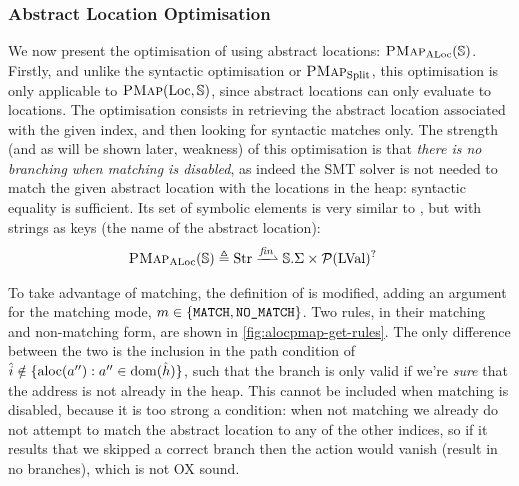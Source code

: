 \subsubsection{Abstract Location Optimisation}

We now present the optimisation of \PMap{} using abstract locations: $\textsc{PMap}_{\text{ALoc}}(\mathbb S)$. Firstly, and unlike the syntactic optimisation or $\textsc{PMap}_{\text{Split}}$, this optimisation is only applicable to $\textsc{PMap}(\text{Loc},\mathbb S)$, since abstract locations can only evaluate to locations. The optimisation consists in retrieving the abstract location associated with the given index, and then looking for syntactic matches only. The strength (and as will be shown later, weakness) of this optimisation is that \emph{there is no branching when matching is disabled}, as indeed the SMT solver is not needed to match the given abstract location with the locations in the heap: syntactic equality is sufficient. Its set of symbolic elements is very similar to \PMap, but with strings as keys (the name of the abstract location): \begin{align*}
	\ALocPMap(\mmdl) &\defeq \Str \finmap \mmdl.\Sigma \times \pset(\LVal)^?
\end{align*}

To take advantage of matching, the definition of  is modified, adding an argument for the matching mode, $m\in\{\texttt{MATCH},\texttt{NO\_MATCH}\}$. Two rules, in their matching and non-matching form, are shown in \autoref{fig:alocpmap-get-rules}. The only difference between the two is the inclusion in the path condition of ${\hat{i}\notin\{\text{aloc}(a''):a''\in \operatorname{dom}(\hat{h})\}}$, such that the branch is only valid if we're \emph{sure} that the address is not already in the heap. This cannot be included when matching is disabled, because it is too strong a condition: when not matching we already do not attempt to match the abstract location to any of the other indices, so if it results that we skipped a correct branch then the action would vanish (result in no branches), which is not OX sound.

